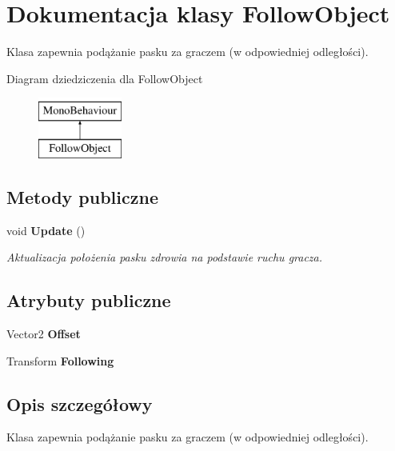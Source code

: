 \section{Dokumentacja klasy Follow\+Object}
\label{class_follow_object}


Klasa zapewnia podążanie pasku za graczem (w odpowiedniej odległości).  


Diagram dziedziczenia dla Follow\+Object\begin{figure}[H]
\begin{center}
\leavevmode
\includegraphics[height=2.000000cm]{class_follow_object}
\end{center}
\end{figure}
\subsection*{Metody publiczne}
\begin{DoxyCompactItemize}
\item 
void {\bf Update} ()
\begin{DoxyCompactList}\small\item\em Aktualizacja położenia pasku zdrowia na podstawie ruchu gracza. \end{DoxyCompactList}\end{DoxyCompactItemize}
\subsection*{Atrybuty publiczne}
\begin{DoxyCompactItemize}
\item 
Vector2 {\bfseries Offset}\label{class_follow_object_a570c760481d19bd4ed4033892797cb62}

\item 
Transform {\bfseries Following}\label{class_follow_object_a6531fc68059005901bccc67fae6d34ec}

\end{DoxyCompactItemize}


\subsection{Opis szczegółowy}
Klasa zapewnia podążanie pasku za graczem (w odpowiedniej odległości). 



